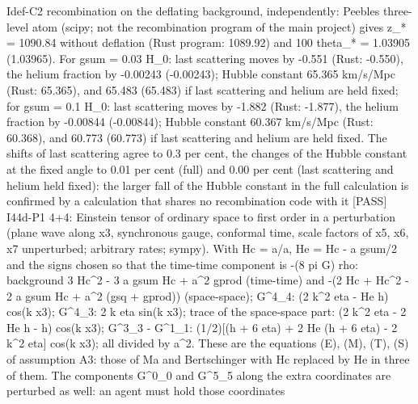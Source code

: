 \documentclass[
  10pt,
]{article}
\newenvironment{Shaded}{}{}
\newcommand{\NormalTok}[1]{#1}
\begin{document}
\begin{Shaded}
\begin{Highlighting}[]
\NormalTok{[PASS] Idef{-}C2  recombination on the deflating background, independently: Peebles\textquotesingle{} three{-}level atom (scipy; not the recombination program of the main project) gives z\_* = 1090.84 without deflation (Rust program: 1089.92) and 100 theta\_* = 1.03905 (1.03965). For gsum = 0.03 H\_0: last scattering moves by {-}0.551 (Rust: {-}0.550), the helium fraction by {-}0.00243 ({-}0.00243); Hubble constant 65.365 km/s/Mpc (Rust: 65.365), and 65.483 (65.483) if last scattering and helium are held fixed; for gsum = 0.1 H\_0: last scattering moves by {-}1.882 (Rust: {-}1.877), the helium fraction by {-}0.00844 ({-}0.00844); Hubble constant 60.367 km/s/Mpc (Rust: 60.368), and 60.773 (60.773) if last scattering and helium are held fixed. The shifts of last scattering agree to 0.3 per cent, the changes of the Hubble constant at the fixed angle to 0.01 per cent (full) and 0.00 per cent (last scattering and helium held fixed): the larger fall of the Hubble constant in the full calculation is confirmed by a calculation that shares no recombination code with it}
\NormalTok{[PASS] I44d{-}P1  4+4: Einstein tensor of ordinary space to first order in a perturbation (plane wave along x3, synchronous gauge, conformal time, scale factors of x5, x6, x7 unperturbed; arbitrary rates; sympy). With Hc = a\textquotesingle{}/a, He = Hc {-} a gsum/2 and the signs chosen so that the time{-}time component is {-}(8 pi G) rho: background 3 Hc\^{}2 {-} 3 a gsum Hc + a\^{}2 gprod (time{-}time) and {-}(2 Hc\textquotesingle{} + Hc\^{}2 {-} 2 a gsum Hc + a\^{}2 (gsq + gprod)) (space{-}space); G\^{}4\_4: (2 k\^{}2 eta {-} He h\textquotesingle{}) cos(k x3); G\^{}4\_3: 2 k eta\textquotesingle{} sin(k x3); trace of the space{-}space part: (2 k\^{}2 eta {-} 2 He h\textquotesingle{} {-} h\textquotesingle{}\textquotesingle{}) cos(k x3); G\^{}3\_3 {-} G\^{}1\_1: (1/2)[(h\textquotesingle{}\textquotesingle{} + 6 eta\textquotesingle{}\textquotesingle{}) + 2 He (h\textquotesingle{} + 6 eta\textquotesingle{}) {-} 2 k\^{}2 eta] cos(k x3); all divided by a\^{}2. These are the equations (E), (M), (T), (S) of assumption A3: those of Ma and Bertschinger with Hc replaced by He in three of them. The components G\^{}0\_0 and G\^{}5\_5 along the extra coordinates are perturbed as well: an agent must hold those coordinates}

\end{Highlighting}
\end{Shaded}
\end{document}
